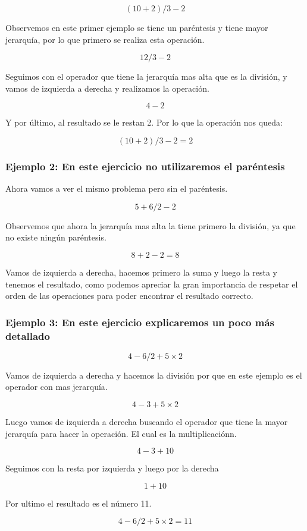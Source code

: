 \[( 10 + 2 ) / 3 - 2\]

Observemos en este primer ejemplo se tiene un paréntesis y tiene mayor jerarquía, por lo que primero se realiza
esta operación.

\[12 / 3 - 2\]

Seguimos con el operador que tiene la jerarquía mas alta que es la división, y vamos de izquierda a derecha y
realizamos la operación.

\[4 - 2\]

Y por último, al resultado se le restan 2. Por lo que la operación nos queda:

\[( 10 + 2 ) / 3 - 2 = 2\]



\subsubsection{Ejemplo 2: En este ejercicio no utilizaremos el paréntesis}


Ahora vamos a ver el mismo problema pero sin el paréntesis.

\[5 + 6 / 2 - 2\]

Observemos que ahora la jerarquía mas alta la tiene primero la división, ya que no existe ningún paréntesis.

\[8 + 2 - 2 = 8\]

Vamos de izquierda a derecha, hacemos primero la suma y luego la resta y tenemos el resultado, como podemos apreciar
la gran importancia de respetar el orden de las operaciones para poder encontrar el resultado correcto.


\subsubsection{Ejemplo 3: En este ejercicio explicaremos un poco más detallado}

\[4 - 6 / 2 + 5 \times 2\]

Vamos de izquierda a derecha y hacemos la división por que en este ejemplo es el operador con mas jerarquía.

\[4 - 3 + 5 \times 2\]

Luego vamos de izquierda a derecha buscando el operador que tiene la mayor jerarquía para hacer la operaci\'on.
El cual es la multiplicaciónn.

\[4 - 3 + 10\]

Seguimos con la resta por izquierda y luego por la derecha

\[1 + 10\]

Por ultimo el resultado es el número 11.

\[4 - 6 / 2 + 5 \times 2 = 11\]

\newpage


\begin{problemas}

\end{problemas}

\newpage